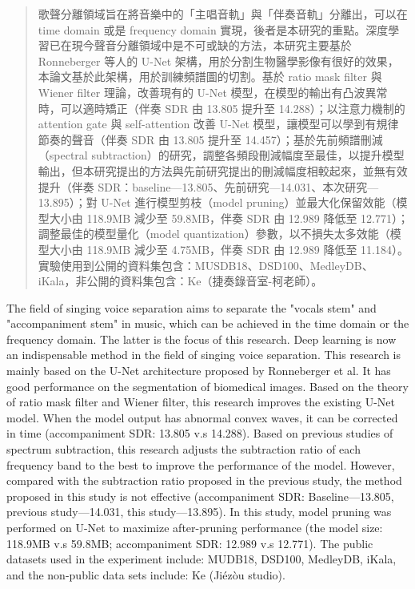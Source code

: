 
\begin{abstract}

歌聲分離領域旨在將音樂中的「主唱音軌」與「伴奏音軌」分離出，可以在 time domain 或是 frequency domain 實現，後者是本研究的重點。深度學習已在現今聲音分離領域中是不可或缺的方法，本研究主要基於 Ronneberger 等人的 U-Net 架構，用於分割生物醫學影像有很好的效果，本論文基於此架構，用於訓練頻譜圖的切割。基於 ratio mask filter 與 Wiener filter 理論，改善現有的 U-Net 模型，在模型的輸出有凸波異常時，可以適時矯正（伴奏 SDR 由 13.805 提升至 14.288）；以注意力機制的 attention gate 與 self-attention 改善 U-Net 模型，讓模型可以學到有規律節奏的聲音（伴奏 SDR 由 13.805 提升至 14.457）；基於先前頻譜刪減（spectral subtraction）的研究，調整各頻段刪減幅度至最佳，以提升模型輸出，但本研究提出的方法與先前研究提出的刪減幅度相較起來，並無有效提升（伴奏 SDR：baseline—13.805、先前研究—14.031、本次研究—13.895）；對 U-Net 進行模型剪枝（model pruning）並最大化保留效能（模型大小由 118.9MB 減少至 59.8MB，伴奏 SDR 由 12.989 降低至 12.771）；調整最佳的模型量化（model quantization）參數，以不損失太多效能（模型大小由 118.9MB 減少至 4.75MB，伴奏 SDR 由 12.989 降低至 11.184）。實驗使用到公開的資料集包含：MUSDB18、DSD100、MedleyDB、iKala，非公開的資料集包含：Ke（捷奏錄音室-柯老師）。

\end{abstract}

\begin{abstract*}

The field of singing voice separation aims to separate the "vocals stem" and "accompaniment stem" in music, which can be achieved in the time domain or the frequency domain. The latter is the focus of this research. Deep learning is now an indispensable method in the field of singing voice separation. This research is mainly based on the U-Net architecture proposed by Ronneberger et al. It has good performance on the segmentation of biomedical images. Based on the theory of ratio mask filter and Wiener filter, this research improves the existing U-Net model. When the model output has abnormal convex waves, it can be corrected in time (accompaniment SDR: 13.805 v.s 14.288). Based on previous studies of spectrum subtraction, this research adjusts the subtraction ratio of each frequency band to the best to improve the performance of the model. However, compared with the subtraction ratio proposed in the previous study, the method proposed in this study is not effective (accompaniment SDR: Baseline—13.805, previous study—14.031, this study—13.895). In this study, model pruning was performed on U-Net to maximize after-pruning performance (the model size: 118.9MB v.s 59.8MB; accompaniment SDR: 12.989 v.s 12.771). The public datasets used in the experiment include: MUDB18, DSD100, MedleyDB, iKala, and the non-public data sets include: Ke (Jiézòu studio).

\end{abstract*}